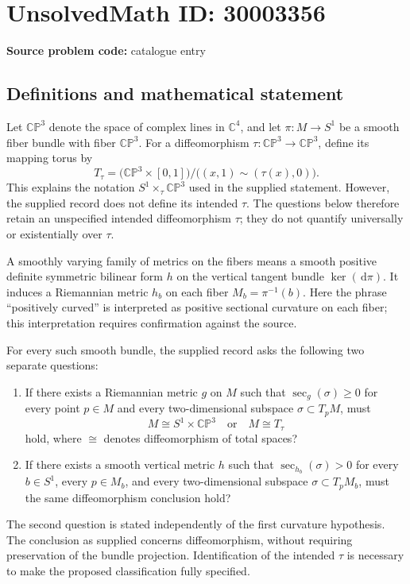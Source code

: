 \documentclass[11pt]{article}
\newcommand{\C}{\mathbb{C}}
\newcommand{\dd}{\,\mathrm{d}}
\begin{document}
\section*{UnsolvedMath ID: 30003356}
\textbf{Source problem code:} catalogue entry
\subsection{Definitions and mathematical statement}
Let \(\mathbb{CP}^{3}\) denote the space of complex lines in \(\C^{4}\), and let \(\pi\colon M\to S^{1}\) be a smooth fiber bundle with fiber \(\mathbb{CP}^{3}\). For a diffeomorphism \(\tau\colon\mathbb{CP}^{3}\to\mathbb{CP}^{3}\), define its mapping torus by
\[
T_{\tau}=\bigl(\mathbb{CP}^{3}\times[0,1]\bigr)\big/\bigl((x,1)\sim(\tau(x),0)\bigr).
\]
This explains the notation \(S^{1}\times_{\tau}\mathbb{CP}^{3}\) used in the supplied statement. However, the supplied record does not define its intended \(\tau\). The questions below therefore retain an unspecified intended diffeomorphism \(\tau\); they do not quantify universally or existentially over \(\tau\).

A smoothly varying family of metrics on the fibers means a smooth positive definite symmetric bilinear form \(h\) on the vertical tangent bundle \(\ker(\dd\pi)\). It induces a Riemannian metric \(h_b\) on each fiber \(M_b=\pi^{-1}(b)\). Here the phrase ``positively curved'' is interpreted as positive sectional curvature on each fiber; this interpretation requires confirmation against the source.

For every such smooth bundle, the supplied record asks the following two separate questions:
\begin{enumerate}
\item If there exists a Riemannian metric \(g\) on \(M\) such that \(\sec_g(\sigma)\geq 0\) for every point \(p\in M\) and every two-dimensional subspace \(\sigma\subset T_pM\), must
\[
M\cong S^{1}\times\mathbb{CP}^{3}\quad\text{or}\quad M\cong T_{\tau}
\]
hold, where \(\cong\) denotes diffeomorphism of total spaces?
\item If there exists a smooth vertical metric \(h\) such that \(\sec_{h_b}(\sigma)>0\) for every \(b\in S^{1}\), every \(p\in M_b\), and every two-dimensional subspace \(\sigma\subset T_pM_b\), must the same diffeomorphism conclusion hold?
\end{enumerate}
The second question is stated independently of the first curvature hypothesis. The conclusion as supplied concerns diffeomorphism, without requiring preservation of the bundle projection. Identification of the intended \(\tau\) is necessary to make the proposed classification fully specified.
\end{document}

